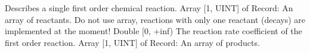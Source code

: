 \begin{RecordType}
	{}
	{} %
	{} %
	{} %
	{{{Describes a single first order chemical reaction.}}}
		\KeyItem
			{}
			{{Array [1, UINT] of }{Record}{: }}
			{\textrangle}
			{} %
			{{{An array of reactants. Do not use array, reactions with only one reactant (decays) are implemented at the moment!}}}
		\KeyItem
			{}
			{{Double [0, +inf)}}
			{\textrangle}
			{} %
			{{{The reaction rate coefficient of the first order reaction.}}}
		\KeyItem
			{}
			{{Array [1, UINT] of }{Record}{: }}
			{\textrangle}
			{} %
			{{{An array of products.}}}
\end{RecordType}
